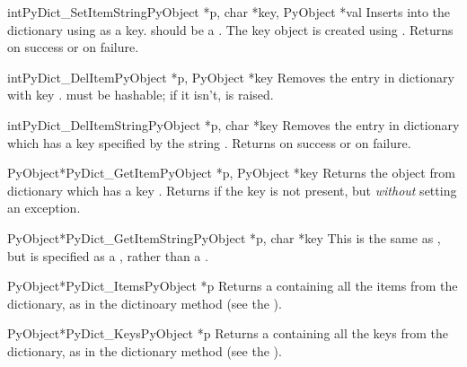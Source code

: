 \begin{cfuncdesc}{int}{PyDict_SetItemString}{PyObject *p,
            char *key,
            PyObject *val}
  Inserts  into the dictionary  using  as a
  key.  should be a .  The key object is created
  using . Returns  on
  success or  on failure.
\end{cfuncdesc}

\begin{cfuncdesc}{int}{PyDict_DelItem}{PyObject *p, PyObject *key}
  Removes the entry in dictionary  with key .
   must be hashable; if it isn't,  is
  raised.
\end{cfuncdesc}

\begin{cfuncdesc}{int}{PyDict_DelItemString}{PyObject *p, char *key}
  Removes the entry in dictionary  which has a key specified by
  the string .  Returns  on success or  on
  failure.
\end{cfuncdesc}

\begin{cfuncdesc}{PyObject*}{PyDict_GetItem}{PyObject *p, PyObject *key}
  Returns the object from dictionary  which has a key
  .  Returns \NULL{} if the key  is not present, but
  \emph{without} setting an exception.
\end{cfuncdesc}

\begin{cfuncdesc}{PyObject*}{PyDict_GetItemString}{PyObject *p, char *key}
  This is the same as , but  is
  specified as a , rather than a .
\end{cfuncdesc}

\begin{cfuncdesc}{PyObject*}{PyDict_Items}{PyObject *p}
  Returns a  containing all the items from the
  dictionary, as in the dictinoary method  (see the
  ).
\end{cfuncdesc}

\begin{cfuncdesc}{PyObject*}{PyDict_Keys}{PyObject *p}
  Returns a  containing all the keys from the
  dictionary, as in the dictionary method  (see the
  ).
\end{cfuncdesc}


